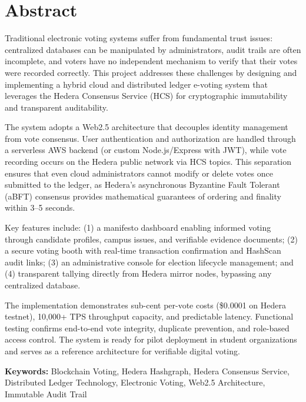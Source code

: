 \chapter*{Abstract}
\thispagestyle{plain}

Traditional electronic voting systems suffer from fundamental trust issues: centralized
databases can be manipulated by administrators, audit trails are often incomplete,
and voters have no independent mechanism to verify that their votes were recorded
correctly. This project addresses these challenges by designing and implementing a
hybrid cloud and distributed ledger e-voting system that leverages the Hedera
Consensus Service (HCS) for cryptographic immutability and transparent auditability.

The system adopts a Web2.5 architecture that decouples identity management from
vote consensus. User authentication and authorization are handled through a
serverless AWS backend (or custom Node.js/Express with JWT), while vote recording
occurs on the Hedera public network via HCS topics. This separation ensures that
even cloud administrators cannot modify or delete votes once submitted to the
ledger, as Hedera's asynchronous Byzantine Fault Tolerant (aBFT) consensus provides
mathematical guarantees of ordering and finality within 3--5 seconds.

Key features include: (1) a manifesto dashboard enabling informed voting through
candidate profiles, campus issues, and verifiable evidence documents; (2) a secure
voting booth with real-time transaction confirmation and HashScan audit links;
(3) an administrative console for election lifecycle management; and (4) transparent
tallying directly from Hedera mirror nodes, bypassing any centralized database.

The implementation demonstrates sub-cent per-vote costs (\$0.0001 on Hedera testnet),
10,000+ TPS throughput capacity, and predictable latency. Functional testing
confirms end-to-end vote integrity, duplicate prevention, and role-based access
control. The system is ready for pilot deployment in student organizations and
serves as a reference architecture for verifiable digital voting.

\vspace{1cm}
\noindent\textbf{Keywords:} Blockchain Voting, Hedera Hashgraph, Hedera Consensus Service,
Distributed Ledger Technology, Electronic Voting, Web2.5 Architecture, Immutable Audit Trail

\cleardoublepage
\mbox{}
\thispagestyle{empty}
\cleardoublepage